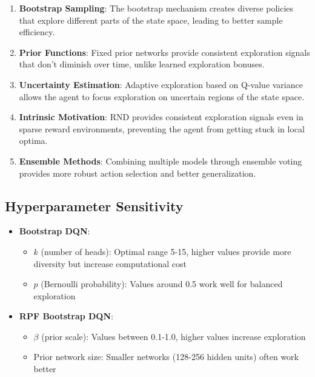 \documentclass[12pt]{article}
\begin{document}
{{{\begin{enumerate}
    \item \textbf{Bootstrap Sampling}: The bootstrap mechanism creates diverse policies that explore different parts of the state space, leading to better sample efficiency.
    
    \item \textbf{Prior Functions}: Fixed prior networks provide consistent exploration signals that don't diminish over time, unlike learned exploration bonuses.
    
    \item \textbf{Uncertainty Estimation}: Adaptive exploration based on Q-value variance allows the agent to focus exploration on uncertain regions of the state space.
    
    \item \textbf{Intrinsic Motivation}: RND provides consistent exploration signals even in sparse reward environments, preventing the agent from getting stuck in local optima.
    
    \item \textbf{Ensemble Methods}: Combining multiple models through ensemble voting provides more robust action selection and better generalization.
\end{enumerate}

\subsection{Hyperparameter Sensitivity}

\begin{itemize}
    \item \textbf{Bootstrap DQN}: 
    \begin{itemize}
        \item $k$ (number of heads): Optimal range 5-15, higher values provide more diversity but increase computational cost
        \item $p$ (Bernoulli probability): Values around 0.5 work well for balanced exploration
    \end{itemize}
    
    \item \textbf{RPF Bootstrap DQN}:
    \begin{itemize}
        \item $\beta$ (prior scale): Values between 0.1-1.0, higher values increase exploration
        \item Prior network size: Smaller networks (128-256 hidden units) often work better
    \end{itemize}
    

\end{itemize}}}}
\end{document}
